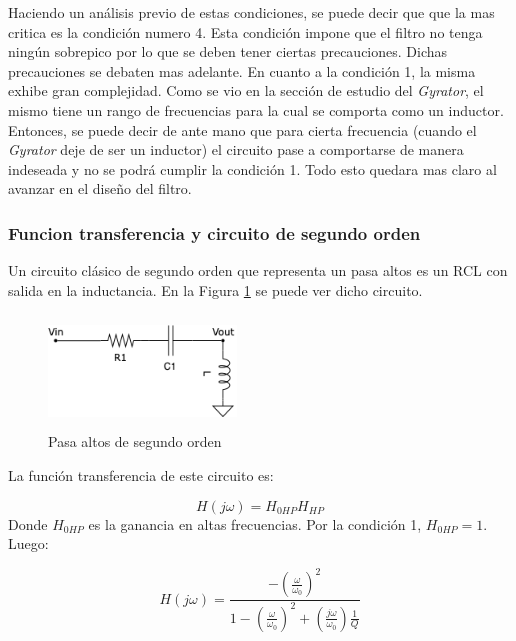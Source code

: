 \documentclass[12pt,a4paper]{article}
\begin{document}
Haciendo un análisis previo de estas condiciones, se puede decir que que la mas critica es la condición numero 4. Esta condición impone que el filtro no tenga ningún sobrepico por lo que se deben tener ciertas precauciones. Dichas precauciones se debaten mas adelante. En cuanto a la condición 1, la misma exhibe gran complejidad. Como se vio en la sección de estudio del \textit{Gyrator}, el mismo tiene un rango de frecuencias para la cual se comporta como un inductor. Entonces, se puede decir de ante mano que para cierta frecuencia (cuando el \textit{Gyrator} deje de ser un inductor) el circuito pase a comportarse de manera indeseada y no se podrá cumplir la condición 1. Todo esto quedara mas claro al avanzar en el diseño del filtro. 

\subsubsection{Funcion transferencia y circuito de segundo orden}

Un circuito clásico de segundo orden que representa un pasa altos es un RCL con salida en la inductancia. En la Figura \ref{ej2_filto_HP} se puede ver dicho circuito. 
\begin{figure}[h!]                                                       
    \centering\includegraphics[width=5cm, height=3cm]{Resources/ej2_hp.png}
    \caption{Pasa altos de segundo orden}
    \label{ej2_filto_HP}
    \end{figure}


La función transferencia de este circuito es:

\begin{displaymath} H(j\omega)= H_{0HP} H_{HP} \end{displaymath}  
Donde $H_{0HP}$ es la ganancia en altas frecuencias. Por la condición 1, $H_{0HP} = 1$. Luego:   

\begin{equation} H(j\omega) = \frac{-(\frac{\omega}{\omega_0})^{2}}{1 - (\frac{\omega}{\omega_0})^{2} + (\frac{j\omega}{\omega_0})\frac{1}{Q}} \label{equ:trans_clasica_hp}\end{equation}  
\end{document}
